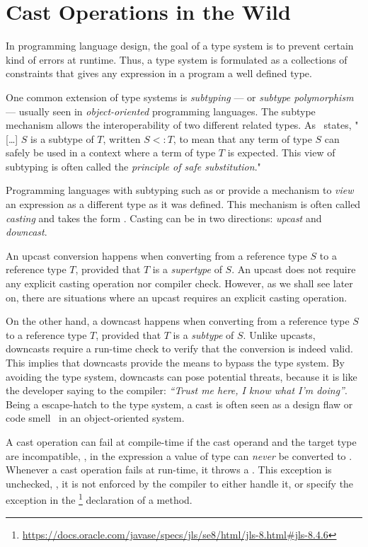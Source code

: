 
\chapter{Cast Operations in the Wild}
\label{cha:casts}

In programming language design, the goal of a type system is to prevent certain kind of errors at runtime.
Thus, a type system is formulated as a collections of constraints that gives any expression in a program a well defined type.

One common extension of type systems is \emph{subtyping} --- or \emph{subtype polymorphism} --- usually seen in \emph{object-oriented} programming languages.
The subtype mechanism allows the interoperability of two different related types.
As~\cite{pierceTypesProgrammingLanguages2002} states, "[\ldots] $S$ is a subtype of $T$, written $S <: T$, to mean that any term of type $S$ can safely be used in a context where a term of type $T$ is expected.
This view of subtyping is often called the \emph{principle of safe substitution}."

Programming languages with subtyping such as \java{} or \cpp{} provide a mechanism to \emph{view} an expression as a different type as it was defined.
This mechanism is often called \emph{casting} and takes the form .
Casting can be in two directions: \emph{upcast} and \emph{downcast}.

An upcast conversion happens when converting from a reference type $S$ to a reference type $T$, provided that $T$ is a \emph{supertype} of $S$.
An upcast does not require any explicit casting operation nor compiler check.
However, as we shall see later on, there are situations where an upcast requires an explicit casting operation.

On the other hand, a downcast happens when converting from a reference type $S$ to a reference type $T$, provided that $T$ is a \emph{subtype} of $S$.
Unlike upcasts, downcasts require a run-time check to verify that the conversion is indeed valid.
This implies that downcasts provide the means to bypass the type system.
By avoiding the type system, downcasts can pose potential threats, because it is like the developer saying to the compiler: \emph{``Trust me here, I know what I'm doing''}.
Being a escape-hatch to the type system, a cast is often seen as a design flaw or code smell~\citep{tufanoWhenWhyYour2015} in an object-oriented system.

A cast operation can fail at compile-time if the cast operand and the target type are incompatible,
\eg, in the expression  a value of type  can \emph{never} be converted to .
Whenever a cast operation fails at run-time, it throws a .
This exception is unchecked, \ie,
it is not enforced by the compiler to either handle it, or
specify the exception in the %
\footnote{\url{https://docs.oracle.com/javase/specs/jls/se8/html/jls-8.html\#jls-8.4.6}}
declaration of a method.

